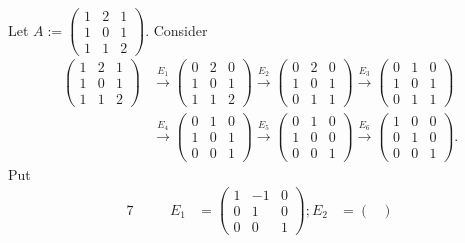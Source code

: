 \begin{Exercise}
\begin{solution}
Let $A := \begin{pmatrix}
1 & 2 & 1 \\
1 & 0 & 1 \\
1 & 1 & 2
\end{pmatrix}$.
Consider
\begin{align*}
\begin{pmatrix}
1 & 2 & 1 \\
1 & 0 & 1 \\
1 & 1 & 2
\end{pmatrix} &\overset{E_1}{\longrightarrow} \begin{pmatrix}
0 & 2 & 0 \\
1 & 0 & 1 \\
1 & 1 & 2
\end{pmatrix} \overset{E_2}{\longrightarrow} \begin{pmatrix}
0 & 2 & 0 \\
1 & 0 & 1 \\
0 & 1 & 1
\end{pmatrix} \overset{E_3}{\longrightarrow} \begin{pmatrix}
0 & 1 & 0 \\
1 & 0 & 1 \\
0 & 1 & 1
\end{pmatrix} \\
&\overset{E_4}{\longrightarrow} \begin{pmatrix}
0 & 1 & 0 \\
1 & 0 & 1 \\
0 & 0 & 1
\end{pmatrix} \overset{E_5}{\longrightarrow} \begin{pmatrix}
0 & 1 & 0 \\
1 & 0 & 0 \\
0 & 0 & 1
\end{pmatrix} \overset{E_6}{\longrightarrow} \begin{pmatrix}
1 & 0 & 0 \\
0 & 1 & 0 \\
0 & 0 & 1
\end{pmatrix}.
\end{align*}
Put 
\begin{alignat*}{7}
\quad&& E_1 &= \begin{pmatrix}
1 & -1 & 0 \\
0 & 1 & 0 \\
0 & 0 & 1
\end{pmatrix}; E_2 &= \begin{pmatrix}

\end{pmatrix}
\end{alignat*}
\end{solution}
\end{Exercise}

